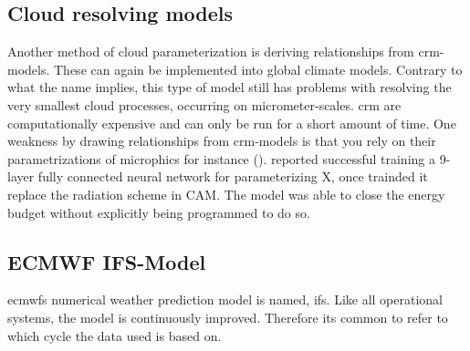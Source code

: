 \subsection{Cloud resolving models} \label{sec:params_climate_models}
Another method of cloud parameterization is deriving relationships from \acrfull{crm}-models. These can again be implemented into global climate models. Contrary to what the name implies, this type of model still has problems with resolving the very smallest cloud processes, occurring on micrometer-scales. 
\acrshort{crm} are computationally expensive and can only be run for a short amount of time. One weakness by drawing  relationships from \acrshort{crm}-models is that you rely on their parametrizations of microphics for instance (\cite{Tomkins2005}).  reported successful training a 9-layer fully connected neural network for parameterizing X, once trainded it replace the radiation scheme in CAM. The model was able to close the energy budget without explicitly being programmed to do so. 

\subsection{ECMWF IFS-Model} \label{sec:era5_param}
\acrfull{ecmwf}s numerical weather prediction model is named, \acrfull{ifs}. Like all operational systems, the model is continuously improved. Therefore its common to refer to which cycle the data used is based on. 

